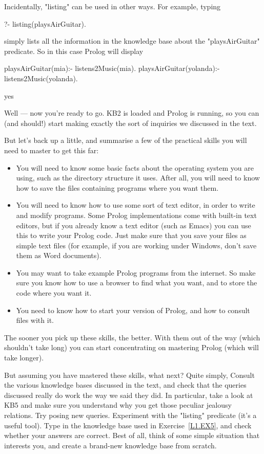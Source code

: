 Incidentally, "listing" can be used in other ways. For example, typing
%
\begin{LPNcodedisplay}
?- listing(playsAirGuitar).
\end{LPNcodedisplay}
%
simply lists all the information in the knowledge base about the
"playsAirGuitar" predicate. So in this case Prolog will display
%
\begin{LPNcodedisplay}
playsAirGuitar(mia):-
   listens2Music(mia).
playsAirGuitar(yolanda):-
   listens2Music(yolanda).

yes
\end{LPNcodedisplay}



Well --- now you're ready to go. KB2 is loaded and Prolog is running,
so you can (and should!) start making exactly the sort of inquiries we
discussed in the text.

But let's back up a little, and summarise a few of the practical
skills you will need to master to get this far:

\begin{itemize}
\item{}You will need to know some basic facts about the operating
system you are using, such as the directory structure it uses. After
all, you will need to know how to save the files containing programs
where you want them.
\item{}You will need to know how to use some sort of text editor, in
order to write and modify programs. Some Prolog implementations come
with built-in text editors, but if you already know a text editor
(such as Emacs) you can use this to write your Prolog code. Just make
sure that you save your files as simple text files (for example, if you
are working under Windows, don't save them as Word documents).
\item{}You may want to take example Prolog programs from the internet.
So make sure you know how to use a browser to find what you want, and
to store the code where you want it.
\item{}You need to know how to start your version of Prolog, and how
to consult files with it.
\end{itemize}


The sooner you pick up these skills, the better. With them out of the
way (which shouldn't take long) you can start concentrating on
mastering Prolog (which will take longer).

But assuming you have mastered these skills, what next?  Quite simply,
 Consult the various knowledge bases
discussed in the text, and check that the queries discussed really do
work the way we said they did.  In particular, take a look at KB5 and
make sure you understand why you get those peculiar jealousy
relations.  Try posing new queries.  Experiment with the "listing"
predicate (it's a useful tool).  Type in the knowledge base used in
Exercise~\ref{L1.EX5}, and check whether your answers are correct.
Best of all, think of some simple situation that interests you, and
create a brand-new knowledge base from scratch.

